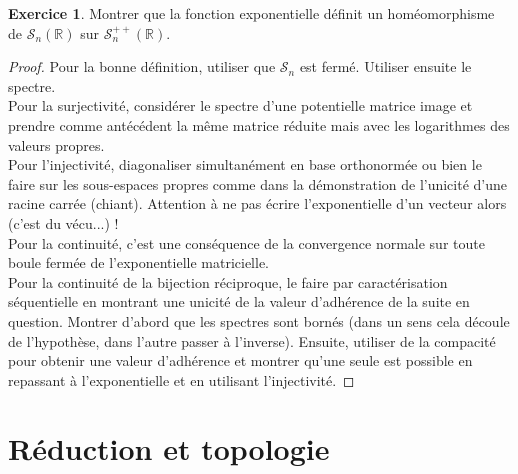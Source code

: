 \documentclass[french]{article}
\newcommand{\R}{\mathbb{R}}
\theoremstyle{definition}
\newtheorem{exo}{Exercice}
\begin{document}
\begin{exo}
	Montrer que la fonction exponentielle définit un homéomorphisme de $\mathcal{S}_n(\R)$ sur $\mathcal{S}_n^{++}(\R)$.
\end{exo}
\begin{proof}
	Pour la bonne définition, utiliser que $\mathcal{S}_n$ est fermé. Utiliser ensuite le spectre.\\
	Pour la surjectivité, considérer le spectre d'une potentielle matrice image et prendre comme antécédent la même matrice réduite mais avec les logarithmes des valeurs propres.\\
	Pour l'injectivité, diagonaliser simultanément en base orthonormée ou bien le faire sur les sous-espaces propres comme dans la démonstration de l'unicité d'une racine carrée (chiant). Attention à ne pas écrire l'exponentielle d'un vecteur alors (c'est du vécu...) !\\
	Pour la continuité, c'est une conséquence de la convergence normale sur toute boule fermée de l'exponentielle matricielle.\\
	Pour la continuité de la bijection réciproque, le faire par caractérisation séquentielle en montrant une unicité de la valeur d'adhérence de la suite en question. Montrer d'abord que les spectres sont bornés (dans un sens cela découle de l'hypothèse, dans l'autre passer à l'inverse). Ensuite, utiliser de la compacité pour obtenir une valeur d'adhérence et montrer qu'une seule est possible en repassant à l'exponentielle et en utilisant l'injectivité.
\end{proof}

\section*{Réduction et topologie}
\end{document}

